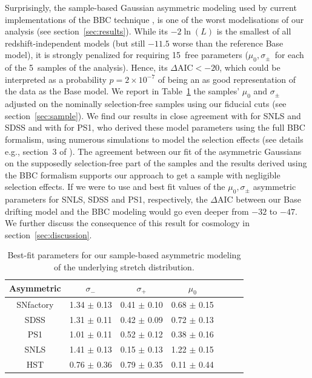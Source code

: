 \documentclass[]{aa} %
\newcommand{\nn}[1]{{\textcolor[rgb]{0.25, 0.50, 0}{#1}}}
\begin{document}
Surprisingly, the sample-based Gaussian asymmetric modeling used by current
implementations of the BBC technique \citep{scolnic2016, kessler2017}, is one of
the worst modelisations of our analysis (see section~\ref{sec:results}). While
its $-2\ln(L)$ is the smallest of all redshift-independent models (but still $-11.5$ worse than the reference Base model), it is
strongly penalized for requiring 15~free parameters ($\mu_0, \sigma_{\pm}$~for
each of the 5~samples of the analysis). Hence, its $\Delta\mathrm{AIC}<-20$, which could be
interpreted as a probability $p=2\times 10^{-7}$ of being an as good representation of the data as the Base model.
We report in Table~\ref{tab:bbc} the
samples' $\mu_0$ and $\sigma_{\pm}$ adjusted on the \nn{nominally}
selection-free samples using our fiducial cuts (see section~\ref{sec:sample}).
We find our results in close agreement with \cite{scolnic2016} for SNLS and SDSS
and with \cite{scolnic2018a} for PS1, who derived these model parameters using
the full BBC formalism, using numerous simulations to model the selection
effects (see details e.g., section~3 of \citealt{kessler2017}). The agreement
between our fit of the asymmetric Gaussians on the supposedly selection-free
part of the samples and the results derived using the BBC formalism supports our
approach to get a sample with negligible selection effects. 
If we were to use \cite{scolnic2016} and \cite{scolnic2018a}
best fit values \nn{of the $\mu_0, \sigma_{\pm}$ asymmetric parameters} for SNLS, SDSS and PS1, respectively,
the $\Delta$AIC between our Base drifting model and the BBC
modeling would go even deeper from $-32$ to $-47$.
We further discuss the consequence of this result for cosmology in
section~\ref{sec:discussion}.
    
\begin{table}
    \centering
    \caption{Best-fit parameters for our sample-based asymmetric modeling of the
    underlying stretch distribution.}
    \label{tab:bbc}
    \begin{tabular}{ccccccc}
    \hline\hline
    Asymmetric & $\sigma_{-}$    & $\sigma_{+}$    & $\mu_0$ \\
    \hline
    SNfactory  & 1.34 $\pm$ 0.13 & 0.41 $\pm$ 0.10 & 0.68 $\pm$ 0.15 \\
    SDSS       & 1.31 $\pm$ 0.11 & 0.42 $\pm$ 0.09 & 0.72 $\pm$ 0.13 \\
    PS1        & 1.01 $\pm$ 0.11 & 0.52 $\pm$ 0.12 & 0.38 $\pm$ 0.16 \\
    SNLS       & 1.41 $\pm$ 0.13 & 0.15 $\pm$ 0.13 & 1.22 $\pm$ 0.15 \\
    HST        & 0.76 $\pm$ 0.36 & 0.79 $\pm$ 0.35 & 0.11 $\pm$ 0.44 \\
    \hline
    \end{tabular}
\end{table}
    
\end{document}
